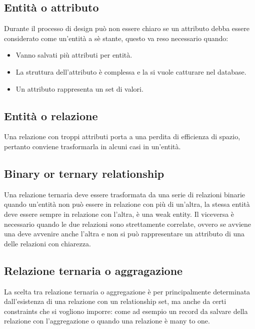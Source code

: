 \subsection{Entit\`a o attributo}
Durante il processo di design pu\`o non essere chiaro se un attributo debba essere considerato come un'entit\`a a s\`e stante, questo va reso necessario quando:
\begin{itemize}
\item Vanno salvati pi\`u attributi per entit\`a.
\item La struttura dell'attributo \`e complessa e la si vuole catturare nel database.
\item Un attributo rappresenta un set di valori.
\end{itemize}
\subsection{Entit\`a o relazione}
Una relazione con troppi attributi porta a una perdita di efficienza di spazio, pertanto conviene trasformarla in alcuni casi in un'entit\`a.
\subsection{Binary or ternary relationship}
Una relazione ternaria deve essere trasformata da una serie di relazioni binarie quando un'entit\`a non pu\`o essere in relazione con pi\`u di un'altra, la stessa entit\`a deve essere sempre in relazione con l'altra, 
\`e una weak entity. Il viceversa \`e necessario quando le due relazioni sono strettamente correlate, ovvero se avviene una deve avvenire anche l'altra e non si pu\`o rappresentare un attributo di una delle 
relazioni con chiarezza.
\subsection{Relazione ternaria o aggragazione}
La scelta tra relazione ternaria o aggregazione \`e per principalmente determinata dall'esistenza di una relazione con un relationship set, ma anche da certi constraints che si vogliono imporre: come ad esempio 
un record da salvare della relazione con l'aggregazione o quando una relazione \`e many to one.